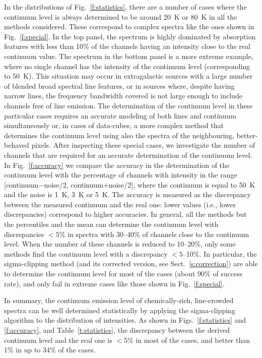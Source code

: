 \documentclass{aa}
\begin{document}
In the distributions of Fig.~\ref{f:statistics}, there are a number of cases where the continuum level is always determined to be around 20~K or 80~K in all the methods considered. These correspond to complex spectra like the ones shown in Fig.~\ref{f:special}. In the top panel, the spectrum is highly dominated by absorption features with less than 10\% of the channels having an intensity close to the real continuum value. The spectrum in the bottom panel is a more extreme example, where no single channel has the intensity of the continuum level (corresponding to 50~K). This situation may occur in extragalactic sources with a large number of blended broad spectral line features, or in sources where, despite having narrow lines, the frequency bandwidth covered is not large enough to include channels free of line emission. The determination of the continuum level in these particular cases requires an accurate modeling of both lines and continuum simultaneously or, in cases of data-cubes, a more complex method that determines the continuum level using also the spectra of the neighbouring, better-behaved pixels. After inspecting these special cases, we investigate the number of channels that are required for an accurate determination of the continuum level. In Fig.~\ref{f:accuracy} we compare the accuracy in the determination of the continuum level with the percentage of channels with intensity in the range [continuum$-$noise/2, continuum$+$noise/2], where the continuum is equal to 50~K and the noise is 1~K, 3~K or 5~K. The accuracy is measured as the discrepancy between the measured continuum and the real one: lower values (i.e., lower discrepancies) correspond to higher accuracies. In general, all the methods but the percentiles and the mean can determine the continuum level with discrepancies $<5$\% in spectra with 30--40\% of channels close to the continuum level. When the number of these channels is reduced to 10--20\%, only some methods find the continuum level with a discrepancy $<5$--10\%. In particular, the sigma-clipping method (and its corrected version, see Sect.~\ref{s:correction}) are able to determine the continuum level for most of the cases (about 90\% of success rate), and only fail in extreme cases like those shown in Fig.~\ref{f:special}.

In summary, the continuum emission level of chemically-rich, line-crowded spectra can be well determined statistically by applying the sigma-clipping algorithm to the distribution of intensities. As shown in Figs.~\ref{f:statistics} and \ref{f:accuracy}, and Table~\ref{t:statistics}, the discrepancy between the derived continuum level and the real one is $<5$\% in most of the cases, and better than 1\% in up to 34\% of the cases.
\end{document}
